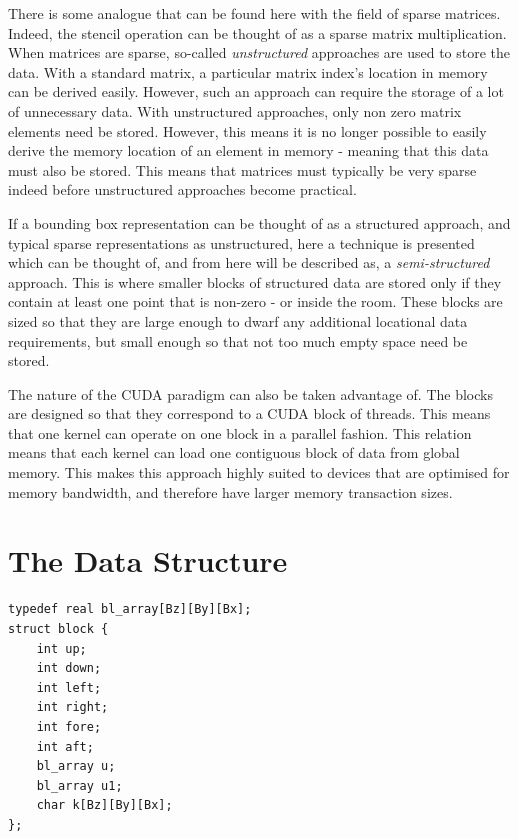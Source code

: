 \documentclass[12pt,a4paper]{report}
\begin{document}
There is some analogue that can be found here with the field of sparse matrices. Indeed, the stencil operation can be thought of as a sparse matrix multiplication. When matrices are sparse, so-called \textit{unstructured} approaches are used to store the data. With a standard matrix, a particular matrix index's location in memory can be derived easily. However, such an approach can require the storage of a lot of unnecessary data. With unstructured approaches, only non zero matrix elements need be stored. However, this means it is no longer possible to easily derive the memory location of an element in memory - meaning that this data must also be stored. This means that matrices must typically be very sparse indeed before unstructured approaches become practical.

If a bounding box representation can be thought of as a structured approach, and typical sparse representations as unstructured, here a technique is presented which can be thought of, and from here will be described as, a \textit{semi-structured} approach. This is where smaller blocks of structured data are stored only if they contain at least one point that is non-zero - or inside the room. These blocks are sized so that they are large enough to dwarf any additional locational data requirements, but small enough so that not too much empty space need be stored.

The nature of the CUDA paradigm can also be taken advantage of. The blocks are designed so that they correspond to a CUDA block of threads. This means that one kernel can operate on one block in a parallel fashion. This relation means that each kernel can load one contiguous block of data from global memory. This makes this approach highly suited to devices that are optimised for memory bandwidth, and therefore have larger memory transaction sizes.

\section{The Data Structure} 
\label{section:data-structure}
\begin{center}
\begin{minipage}{0.8\textwidth}
\begin{lstlisting}[frame=single]
typedef real bl_array[Bz][By][Bx];
struct block {
    int up;
    int down;
    int left;
    int right;
    int fore;
    int aft;
    bl_array u;
    bl_array u1;
    char k[Bz][By][Bx];
};
\end{lstlisting}
\end{minipage}
\end{center}
\end{document}
